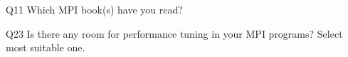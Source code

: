 \begin{description}%
\item{Q11} Which MPI book(s) have you read?%
\item{Q23} Is there any room for performance tuning in your MPI programs? Select most suitable one.%
\end{description}%
